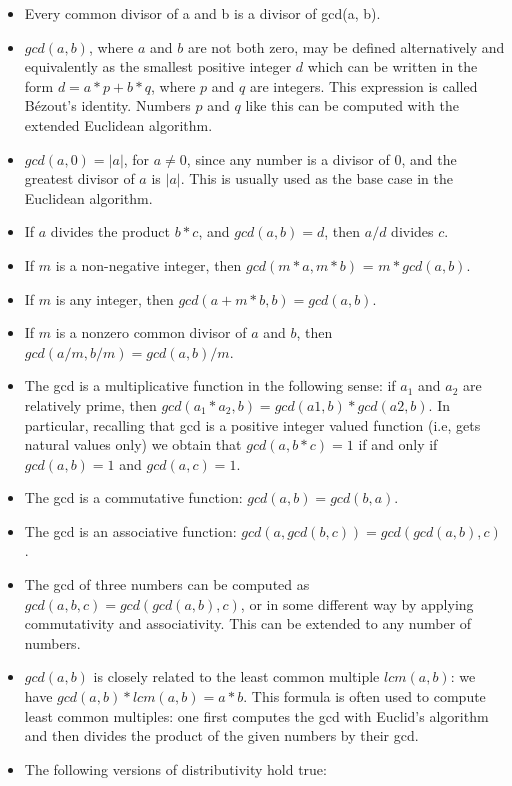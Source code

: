   \begin{itemize}
    \item Every common divisor of a and b is a divisor of gcd(a, b).
    \item $gcd(a, b)$, where $a$ and $b$ are not both zero, may be defined alternatively and equivalently as the smallest positive integer $d$ which can be written in the form $d = a*p + b*q$, where $p$ and $q$ are integers. This expression is called Bézout's identity. Numbers $p$ and $q$ like this can be computed with the extended Euclidean algorithm.
    \item $gcd(a, 0) = |a|$, for $a \neq 0$, since any number is a divisor of $0$, and the greatest divisor of $a$ is $|a|$. This is usually used as the base case in the Euclidean algorithm.
    \item If $a$ divides the product $b*c$, and $gcd(a, b) = d$, then $a/d$ divides $c$.
    \item If $m$ is a non-negative integer, then $gcd(m*a, m*b)$ = $m*gcd(a, b)$.
    \item If $m$ is any integer, then $gcd(a + m*b, b) = gcd(a, b)$.
    \item If $m$ is a nonzero common divisor of $a$ and $b$, then $gcd(a/m, b/m) = gcd(a, b)/m$.
    \item The gcd is a multiplicative function in the following sense: if $a_1$ and $a_2$ are relatively prime, then $gcd(a_1*a_2, b) = gcd(a1, b)*gcd(a2, b)$. In particular, recalling that gcd is a positive integer valued function (i.e, gets natural values only) we obtain that $gcd(a, b*c) = 1$ if and only if $gcd(a, b) = 1$ and $gcd(a, c) = 1$.
    \item The gcd is a commutative function: $gcd(a, b) = gcd(b, a)$.
    \item The gcd is an associative function: $gcd(a, gcd(b, c)) = gcd(gcd(a, b), c)$.
    \item The gcd of three numbers can be computed as $gcd(a, b, c) = gcd(gcd(a, b), c)$, or in some different way by applying commutativity and associativity. This can be extended to any number of numbers.
    \item $gcd(a, b)$ is closely related to the least common multiple $lcm(a, b)$: we have $gcd(a, b)*lcm(a, b) = a*b$. This formula is often used to compute least common multiples: one first computes the gcd with Euclid's algorithm and then divides the product of the given numbers by their gcd.
    \item The following versions of distributivity hold true:

\end{itemize}
